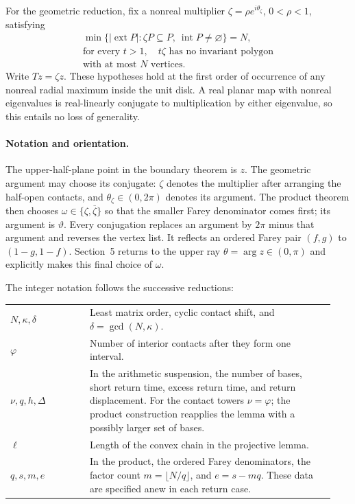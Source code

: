 \documentclass[11pt,a4paper]{article}
\DeclareMathOperator{\ext}{ext}
\theoremstyle{definition}
\theoremstyle{remark}
\numberwithin{equation}{section}
\begin{document}
For the geometric reduction, fix a nonreal multiplier $\zeta=\rho e^{i\theta_\zeta}$, $0<\rho<1$, satisfying
\begin{equation}\label{eq:extremal}
 \begin{gathered}
 \min\{|\ext P|:\zeta P\subseteq P,\ \operatorname{int}P\ne\varnothing\}=N,\\
 \text{for every }t>1,\quad t\zeta\text{ has no invariant polygon}\\
 \text{with at most }N\text{ vertices}.
 \end{gathered}
\end{equation}
Write $Tz=\zeta z$. These hypotheses hold at the first order of occurrence of any nonreal radial maximum inside the unit disk. A real planar map with nonreal eigenvalues is real-linearly conjugate to multiplication by either eigenvalue, so this entails no loss of generality.

\paragraph{Notation and orientation.}
The upper-half-plane point in the boundary theorem is $z$.
The geometric argument may choose its conjugate: $\zeta$ denotes the
multiplier after arranging the half-open contacts, and
$\theta_\zeta\in(0,2\pi)$ denotes its argument. The product theorem
then chooses $\omega\in\{\zeta,\overline\zeta\}$ so that the smaller
Farey denominator comes first; its argument is $\vartheta$.
Every conjugation replaces an argument by $2\pi$ minus that argument
and reverses the vertex list. It reflects an ordered Farey pair
$(f,g)$ to $(1-g,1-f)$. Section~5 returns to the upper ray
$\theta=\arg z\in(0,\pi)$ and explicitly makes this final choice of
$\omega$.

The integer notation follows the successive reductions:
\begin{center}
\begin{tabular}{@{}p{0.23\linewidth}p{0.71\linewidth}@{}}
$N,\kappa,\delta$ & Least matrix order, cyclic contact shift, and
 $\delta=\gcd(N,\kappa)$.\\[3pt]
$\varphi$ & Number of interior contacts after they form one interval.\\[3pt]
$\nu,q,h,\Delta$ & In the arithmetic suspension, the number of bases,
 short return time, excess return time, and return displacement.
 For the contact towers $\nu=\varphi$; the product construction reapplies the lemma
 with a possibly larger set of bases.\\[3pt]
$\ell$ & Length of the convex chain in the projective lemma.\\[3pt]
$q,s,m,e$ & In the product, the ordered Farey denominators,
 the factor count $m=\lfloor N/q\rfloor$, and $e=s-mq$.
 These data are specified anew in each return case.
\end{tabular}
\end{center}
\end{document}
